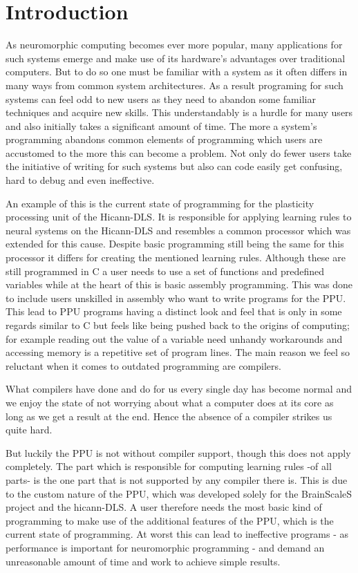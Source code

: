 \chapter{Introduction}
\label{chapter:introduction}

As neuromorphic computing becomes ever more popular, many applications for such systems emerge and make use of its hardware's advantages over traditional computers.
But to do so one must be familiar with a system as it often differs in many ways from common system architectures.
As a result programing for such systems can feel odd to new users as they need to abandon some familiar techniques and acquire new skills.
This understandably is a hurdle for many users and also initially takes a significant amount of time. 
The more a system's programming abandons common elements of programming which users are accustomed to the more this can become a problem.
Not only do fewer users take the initiative of writing for such systems but also can code easily get confusing, hard to debug and even ineffective.

An example of this is the current state of programming for the plasticity processing unit of the Hicann-DLS.
It is responsible for applying learning rules to neural systems on the Hicann-DLS and resembles a common processor which was extended for this cause.
Despite basic programming still being the same for this processor it differs for creating the mentioned learning rules.
Although these are still programmed in C a user needs to use a set of functions and predefined variables while at the heart of this is basic assembly programming.
This was done to include users unskilled in assembly who want to write programs for the PPU.
This lead to PPU programs having a distinct look and feel that is only in some regards similar to C but feels like being pushed back to the origins of computing; for example reading out the value of a variable need unhandy workarounds and accessing memory is a repetitive set of program lines.
The main reason we feel so reluctant when it comes to outdated programming are compilers.

What compilers have done and do for us every single day has become normal and we enjoy the state of not worrying about what a computer does at its core as long as we get a result at the end.
Hence the absence of a compiler strikes us quite hard. 

But luckily the PPU is not without compiler support, though this does not apply completely.
The part which is responsible for computing learning rules -of all parts- is the one part that is not supported by any compiler there is. 
This is due to the custom nature of the PPU, which was developed solely for the BrainScaleS project and the hicann-DLS.
A user therefore needs the most basic kind of programming to make use of the additional features of the PPU, which is the current state of programming.
At worst this can lead to ineffective programs - as performance is important for neuromorphic programming - and demand an unreasonable amount of time and work to achieve simple results.

